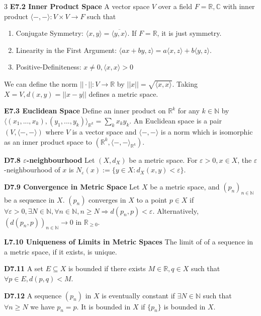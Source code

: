 \documentclass[10pt, landscape]{article}
\begin{document}
\begin{multicols*}{3}
\textbf{E7.2 Inner Product Space} A vector space $V$ over a field $F=\mathbb{R}, \mathbb{C}$ with inner product $\langle-, - \rangle : V \times V \rightarrow F$ such that
\begin{enumerate}
    \item Conjugate Symmetry: $\langle x, y\rangle = \overline{\langle y, x \rangle}$. If $F=\mathbb{R}$, it is just symmetry.
    \item Linearity in the First Argument: $\langle ax+by, z\rangle = a\langle x, z \rangle + b \langle y, z \rangle$.
    \item Positive-Definiteness: $x \neq 0, \langle x, x \rangle > 0$
\end{enumerate}
We can define the norm $||\cdot||:V\rightarrow\mathbb{R}$ by $||x||=\sqrt{\langle x, x \rangle}$. Taking $X=V, d(x, y)=||x-y||$ defines a metric space.

\textbf{E7.3 Euclidean Space} Define an inner product on $\mathbb{R}^k$ for any $k \in \mathbb{N}$ by $\langle(x_1,...,x_k), (y_1,...,y_k)\rangle_{\mathbb{R}^k}=\sum_kx_ky_k$. An Euclidean space is a pair $(V, \langle -, -\rangle)$ where $V$ is a vector space and $\langle -, - \rangle$ is a norm which is isomorphic as an inner product space to $( \mathbb{R}^k, \langle -, - \rangle_{\mathbb{R}^k})$.

\textbf{D7.8 $\varepsilon$-neighbourhood} Let $(X, d_X)$ be a metric space. For $\varepsilon > 0, x \in X$, the $\varepsilon$-neighbourhood of $x$ is $N_\varepsilon(x):=\{y \in X: d_X(x, y) < \varepsilon\}$.

\textbf{D7.9 Convergence in Metric Space} Let $X$ be a metric space, and $(p_n)_{n \in \mathbb{N}}$ be a sequence in $X$. $(p_n)$ converges in $X$ to a point $p \in X$ if $\forall \varepsilon > 0, \exists N \in \mathbb{N}, \forall n \in \mathbb{N}, n \geq N \Rightarrow d(p_n, p) < \varepsilon$. Alternatively, $(d(p_n, p))_{n \in \mathbb{N}} \rightarrow 0$ in $\mathbb{R}_{\geq0}$.

\textbf{L7.10 Uniqueness of Limits in Metric Spaces} The limit of of a sequence in a metric space, if it exists, is unique.

\textbf{D7.11} A set $E \subseteq X$ is bounded if there exists $M \in \mathbb{R}, q \in X$ such that $\forall p \in E, d(p, q) < M$.

\textbf{D7.12} A sequence $(p_n)$ in $X$ is eventually constant if $\exists N \in \mathbb{N}$ such that $\forall n \geq N$ we have $p_n = p$. It is bounded in $X$ if $\{p_n\}$ is bounded in $X$.


\end{multicols*}
\end{document}
